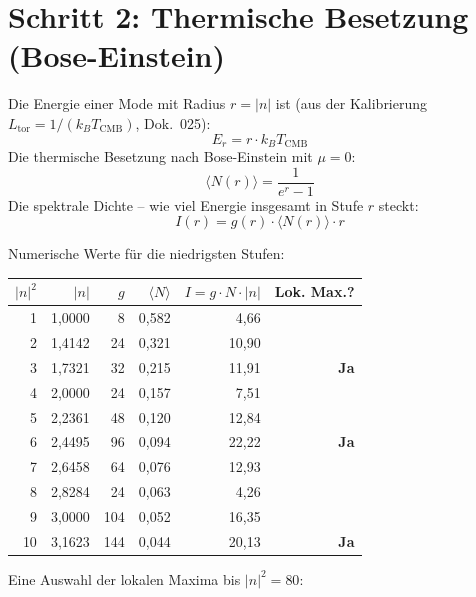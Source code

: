 \section{Schritt 2: Thermische Besetzung (Bose-Einstein)}

Die Energie einer Mode mit Radius $r = |n|$ ist (aus der Kalibrierung
$L_\mathrm{tor} = 1/(k_B T_\mathrm{CMB})$, Dok.~025):
\[
  E_r = r \cdot k_B T_\mathrm{CMB}
\]
Die thermische Besetzung nach Bose-Einstein mit $\mu = 0$:
\[
  \langle N(r) \rangle = \frac{1}{e^r - 1}
\]
Die spektrale Dichte -- wie viel Energie insgesamt in Stufe $r$ steckt:
\[
  \boxed{I(r) = g(r) \cdot \langle N(r) \rangle \cdot r}
\]

Numerische Werte für die niedrigsten Stufen:

\begin{center}
\begin{tabular}{rrrrrr}
\toprule
$|n|^2$ & $|n|$ & $g$ & $\langle N\rangle$ & $I = g\cdot N\cdot |n|$ & Lok. Max.? \\
\midrule
1  & 1{,}0000 & 8   & 0{,}582 & 4{,}66  & \\
2  & 1{,}4142 & 24  & 0{,}321 & 10{,}90 & \\
3  & 1{,}7321 & 32  & 0{,}215 & 11{,}91 & \textbf{Ja} \\
4  & 2{,}0000 & 24  & 0{,}157 & 7{,}51  & \\
5  & 2{,}2361 & 48  & 0{,}120 & 12{,}84 & \\
6  & 2{,}4495 & 96  & 0{,}094 & 22{,}22 & \textbf{Ja} \\
7  & 2{,}6458 & 64  & 0{,}076 & 12{,}93 & \\
8  & 2{,}8284 & 24  & 0{,}063 & 4{,}26  & \\
9  & 3{,}0000 & 104 & 0{,}052 & 16{,}35 & \\
10 & 3{,}1623 & 144 & 0{,}044 & 20{,}13 & \textbf{Ja} \\
\bottomrule
\end{tabular}
\end{center}

Eine Auswahl der lokalen Maxima bis $|n|^2 = 80$:

